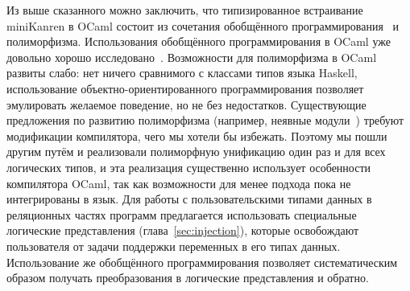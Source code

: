 Из выше сказанного можно заключить, что типизированное встраивание miniKanren в OCaml состоит из сочетания обобщённого программирования~\cite{DGP} и \adhoc{}  полиморфизма.
Использования обобщённого программирования в OCaml уже довольно хорошо исследовано~\cite{Deriving}.
Возможности для \adhoc{} полиморфизма в OCaml развиты слабо: нет ничего сравнимого с классами типов языка Haskell, использование объектно-ориентированного программирования позволяет эмулировать желаемое поведение, но не без недостатков.
Существующие предложения по развитию \adhoc{} полиморфизма (например, неявные модули~\cite{Implicits}) требуют модификации компилятора, чего мы хотели бы избежать.
Поэтому мы пошли другим путём и реализовали полиморфную унификацию один раз и для всех логических типов, и эта реализация существенно использует особенности компилятора OCaml,
так как возможности для менее \adhoc{} подхода пока не интегрированы в язык.
Для работы с пользовательскими типами данных в реляционных частях программ предлагается использовать специальные логические представления (глава~\ref{sec:injection}), которые освобождают пользователя от задачи поддержки переменных в его типах данных.
Использование же обобщённого программирования позволяет систематическим образом получать преобразования в логические представления и обратно.

%
%
%
